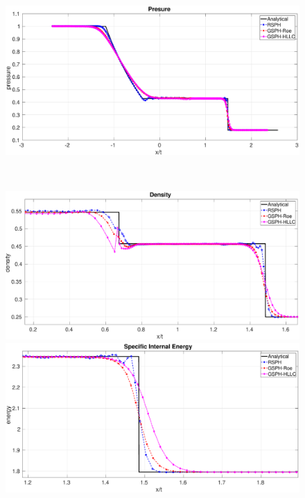 \documentclass[review]{elsarticle}
\begin{document}
\begin{figure}[H]
\begin{minipage}{.495\textwidth}
    \end{minipage}%
    \begin{minipage}{.495 \textwidth}
        \centering
        \includegraphics[width=0.99 \textwidth]{./Figures/Sod/RCM-Sod-GSPH-compare-p}
    \end{minipage}%
    \\
    \begin{minipage}{.495\textwidth}
        \centering
        \includegraphics[width=0.99 \textwidth]{./Figures/Sod/RCM-Sod-GSPH-compare-rho-zoom}
    \end{minipage}%
    \begin{minipage}{.495 \textwidth}
        \centering
        \includegraphics[width=0.99 \textwidth]{./Figures/Sod/RCM-Sod-GSPH-compare-e-zoom}

\end{minipage}
\end{figure}
\end{document}
